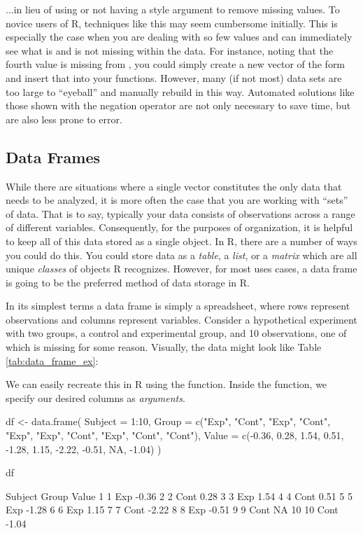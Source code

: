 ...in lieu of using or not having a  style argument to remove missing values.  To novice users of R, techniques like this may seem cumbersome initially.  This is especially the case when you are dealing with so few values and can immediately see what is and is not missing within the data. For instance, noting that the fourth value is missing from , you could simply create a new vector of the form  and insert that into your functions. However, many (if not most) data sets are too large to ``eyeball'' and manually rebuild in this way. Automated solutions like those shown with the negation operator are not only necessary to save time, but are also less prone to error.

\subsection{Data Frames}
\label{sec:data_frames}

While there are situations where a single vector constitutes the only data that needs to be analyzed, it is more often the case that you are working with ``sets'' of data.  That is to say, typically your data consists of observations across a range of different variables.  Consequently, for the purposes of organization, it is helpful to keep all of this data stored as a single object.  In R, there are a number of ways you could do this.  You could store data as a \textit{table}, a \textit{list}, or a \textit{matrix} which are all unique \textit{classes} of objects R recognizes. However, for most uses cases, a \gls{data frame} is going to be the preferred method of data storage in R.

In its simplest terms a data frame is simply a spreadsheet, where rows represent observations and columns represent variables. Consider a hypothetical experiment with two groups, a control and experimental group, and 10 observations, one of which is missing for some reason. Visually, the data might look like Table \ref{tab:data_frame_ex}: 

\medskip



\noindent
We can easily recreate this in R using the  function. Inside the function, we specify our desired columns as \textit{arguments}.

\begin{inR}
df <- data.frame(
  Subject = 1:10,
  Group = c("Exp", "Cont", "Exp", "Cont", "Exp", "Exp",
            "Cont", "Exp", "Cont", "Cont"),
  Value = c(-0.36,  0.28,  1.54,  0.51, -1.28,  1.15,
            -2.22, -0.51,  NA, -1.04)
)

df
\end{inR}
\begin{outR}
   Subject Group Value
1        1   Exp -0.36
2        2  Cont  0.28
3        3   Exp  1.54
4        4  Cont  0.51
5        5   Exp -1.28
6        6   Exp  1.15
7        7  Cont -2.22
8        8   Exp -0.51
9        9  Cont    NA
10      10  Cont -1.04
\end{outR}

